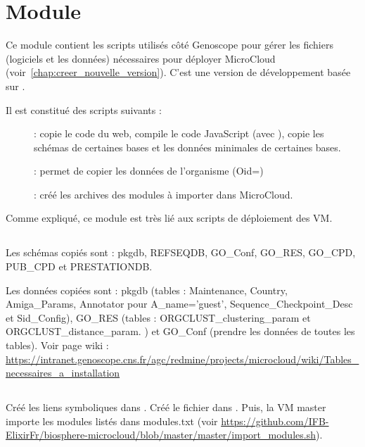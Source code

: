 \chapter{Module \micWEBdeployVer} \label{chap:micwebdeploy}

Ce module contient les scripts utilisés côté Genoscope pour gérer les fichiers (logiciels et les données) nécessaires pour déployer MicroCloud (voir~\autoref{chap:creer_nouvelle_version}).
C'est une version de développement basée sur .

Il est constitué des scripts suivants :
\begin{description}
    \item[] : copie le code du web, compile le code JavaScript (avec ), copie les schémas de certaines bases et les données minimales de certaines bases.
    \item[] : permet de copier les données de l'organisme \theOrg{} (Oid=\theOid)
    \item[]: créé les archives des modules à importer dans MicroCloud.
\end{description}

Comme expliqué, ce module est très lié aux scripts de déploiement des VM.

\section{}

Les schémas copiés sont : pkgdb, REFSEQDB, GO\_Conf, GO\_RES, GO\_CPD, PUB\_CPD et PRESTATIONDB.
\newline

Les données copiées sont : pkgdb (tables : Maintenance, Country, Amiga\_Params,
Annotator pour A\_name='guest', Sequence\_Checkpoint\_Desc et Sid\_Config), GO\_RES (tables : ORGCLUST\_clustering\_param et ORGCLUST\_distance\_param.
) et GO\_Conf (prendre les données de toutes les tables). Voir page wiki : \url{https://intranet.genoscope.cns.fr/agc/redmine/projects/microcloud/wiki/Tables_necessaires_a_installation}


\section{}

Créé les liens symboliques dans .
Créé le fichier  dans .
\newline
Puis, la VM master importe les modules listés dans modules.txt (voir \url{https://github.com/IFB-ElixirFr/biosphere-microcloud/blob/master/master/import_modules.sh}).

